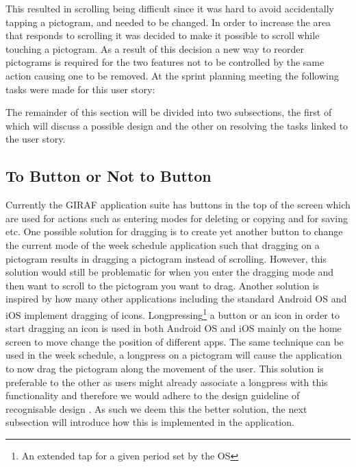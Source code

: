 This resulted in scrolling being difficult since it was hard to avoid accidentally tapping a pictogram, and needed to be changed.
In order to increase the area that responds to scrolling  it was decided to make it possible to scroll while touching a pictogram.
As a result of this decision a new way to reorder pictograms is required for the two features not to be controlled by the same action causing one to be removed.
\bigskip \noindent
At the sprint planning meeting the following tasks were made for this user story:
\begin{enumberate}
    \item {}
    \item {}
\end{enumberate}
The remainder of this section will be divided into two subsections, the first of which will discuss a possible design and the other on resolving the tasks linked to the user story.

\subsection*{To Button or Not to Button} %
Currently the GIRAF application suite has buttons in the top of the screen which are used for actions such as entering modes for deleting or copying and for saving etc.
One possible solution for dragging is to create yet another button to change the current mode of the week schedule application such that dragging on a pictogram results in dragging a pictogram instead of scrolling.
However, this solution would still be problematic for when you enter the dragging mode and then want to scroll to the pictogram you want to drag.
Another solution is inspired by how many other applications including the standard Android OS and iOS implement dragging of icons.
Longpressing\footnote{An extended tap for a given period set by the OS} a button or an icon in order to start dragging an icon is used in both Android OS and iOS mainly on the home screen to move change the position of different apps.
The same technique can be used in the week schedule, a longpress on a pictogram will cause the application to now drag the pictogram along the movement of the user.
This solution is preferable to the other as users might already associate a longpress with this functionality and therefore we would adhere to the design guideline of recognisable design \cite[p.~51]{DESIGNBOOK}.
As such we deem this the better solution, the next subsection will introduce how this is implemented in the application.

